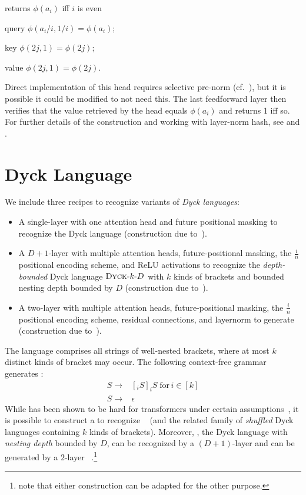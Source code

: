 \begin{head}{returns $\phi(a_i)$ iff $i$ is even}
    \item query $\phi(a_i/i, 1/i) = \phi(a_i)$;
    \item key $\phi(2j, 1) = \phi(2j)$;
    \item value $\phi(2j, 1) = \phi(2j)$.
\end{head}

Direct implementation of this head requires selective pre-norm (cf.~), but it is possible it could be modified to not need this.
The last feedforward layer then verifies that the value retrieved by the head equals $\phi(a_i)$ and returns 1 iff so.
For further details of the construction and working with layer-norm hash, see  and \citet{merrill-2024-little-depth,merrill-sabharwal-2024-cot}.

\section{Dyck Language}
We include three recipes to recognize variants of \textit{Dyck languages}:\begin{itemize}
    \item A single-layer \SMAT{} with one attention head and future positional masking to recognize the Dyck language  (construction due to~\citet{bhattamishra2020ability}).
    \item A $D{+}1$-layer \UHAT{} with multiple attention heads, future-positional masking, the $\frac{i}{n}$ positional encoding scheme, and ReLU activations to recognize the \textit{depth-bounded} Dyck language $\textsc{Dyck}\text{-}k\text{-}D$ with $k$ kinds of brackets and bounded nesting depth bounded by $D$ (construction due to~\citet{yao-2021-self-attention}).
    \item A two-layer \SMAT{} with multiple attention heads, future-positional masking, the $\frac{i}{n}$ positional encoding scheme, residual connections, and layernorm to generate  (construction due to~\citet{yao-2021-self-attention}). 
\end{itemize}

The language  comprises all strings of well-nested brackets, where at most $k$ distinct kinds of bracket may occur. The following context-free grammar generates :\begin{align*}
    S \rightarrow & [_i S]_iS \; \text{for}\, i \in [k]\\
    S \rightarrow & \epsilon
\end{align*}
While  has been shown to be hard for transformers under certain assumptions~\citep{hahn-2020-theoretical,bhattamishra2020ability}, it is possible to construct a \SMAT{} to recognize ~\citet{bhattamishra2020ability} (and the related family of \textit{shuffled} Dyck languages containing $k$ kinds of brackets). Moreover, , the Dyck language with \textit{nesting depth} bounded by $D$, can be recognized by a $(D+1)$-layer \UHAT{} and can be generated by a $2$-layer ~\citep{yao-2021-self-attention}.\footnote{\citet{yao-2021-self-attention} note that either construction can be adapted for the other purpose.}

